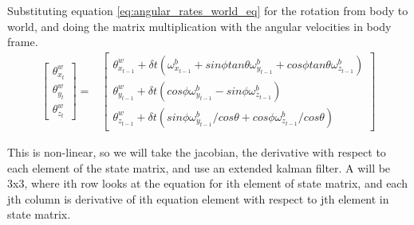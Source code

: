 \documentclass[conference]{IEEEtran}
\begin{document}
Substituting equation \ref{eq:angular_rates_world_eq} for the rotation from body to world, and doing the matrix multiplication with the angular velocities in body frame.
\begin{align}
\begin{bmatrix} 
\theta_{x_{t}}^{w}\\
\theta_{y_{t}}^{w}\\
\theta_{z_{t}}^{w}\end{bmatrix} =& \begin{bmatrix} 
\theta_{x_{t-1}}^{w} + \delta t (\omega_{x_{t-1}}^b + sin\phi tan \theta \omega_{y_{t-1}}^b + cos\phi tan\theta \omega_{z_{t-1}}^b) \\
\theta_{y_{t-1}}^{w} + \delta t (cos\phi \omega_{y_{t-1}}^b - sin\phi \omega_{z_{t-1}}^b) \\
\theta_{z_{t-1}}^{w} + \delta t (sin\phi  \omega_{y_{t-1}}^b / cos \theta + cos\phi \omega_{z_{t-1}}^b  / cos\theta) \end{bmatrix} \nonumber
\end{align}

This is non-linear, so we will take the jacobian, the derivative with respect to each element of the state matrix, and use an extended kalman filter. A will be 3x3, where ith row looks at the equation for ith element of state matrix, and each jth column is derivative of ith equation element with respect to jth element in state matrix.
\end{document}

